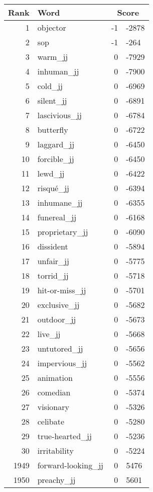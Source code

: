 \begin{longtable}[!htbp]{| rlr@{.}l |}
    \hline
    \textbf{Rank} & \textbf{Word} & \multicolumn{2}{c|}{\textbf{Score}} \\
    \hline
    \endhead
    1 & objector & -1 & -2878 \\
    2 & sop & -1 & -264 \\
    3 & warm\_jj & 0 & -7929 \\
    4 & inhuman\_jj & 0 & -7900 \\
    5 & cold\_jj & 0 & -6969 \\
    6 & silent\_jj & 0 & -6891 \\
    7 & lascivious\_jj & 0 & -6784 \\
    8 & butterfly & 0 & -6722 \\
    9 & laggard\_jj & 0 & -6450 \\
    10 & forcible\_jj & 0 & -6450 \\
    11 & lewd\_jj & 0 & -6422 \\
    12 & risqué\_jj & 0 & -6394 \\
    13 & inhumane\_jj & 0 & -6355 \\
    14 & funereal\_jj & 0 & -6168 \\
    15 & proprietary\_jj & 0 & -6090 \\
    16 & dissident & 0 & -5894 \\
    17 & unfair\_jj & 0 & -5775 \\
    18 & torrid\_jj & 0 & -5718 \\
    19 & hit-or-miss\_jj & 0 & -5701 \\
    20 & exclusive\_jj & 0 & -5682 \\
    21 & outdoor\_jj & 0 & -5673 \\
    22 & live\_jj & 0 & -5668 \\
    23 & untutored\_jj & 0 & -5656 \\
    24 & impervious\_jj & 0 & -5562 \\
    25 & animation & 0 & -5556 \\
    26 & comedian & 0 & -5374 \\
    27 & visionary & 0 & -5326 \\
    28 & celibate & 0 & -5280 \\
    29 & true-hearted\_jj & 0 & -5236 \\
    30 & irritability & 0 & -5224 \\
    1949 & forward-looking\_jj & 0 & 5476 \\
    1950 & preachy\_jj & 0 & 5601 \\

\end{longtable}
